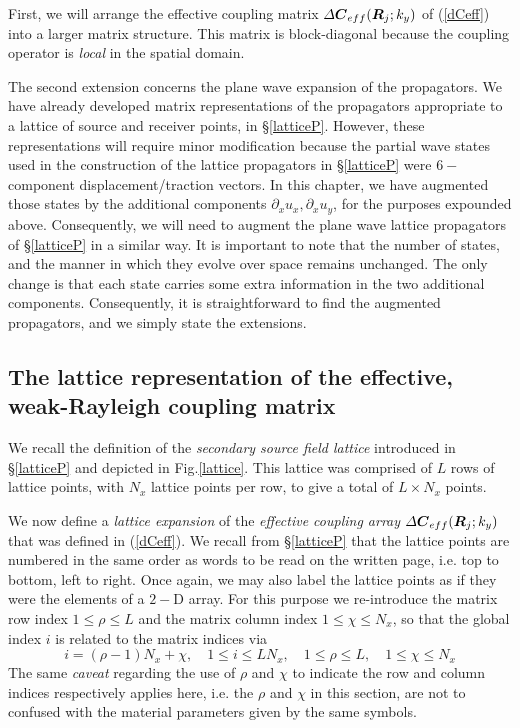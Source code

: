 First, we will arrange the effective coupling matrix ${\mit \Delta}{\mbox{\boldmath$\mit C$\unboldmath}}{}_{eff}({\mbox{\boldmath$\mit R$\unboldmath}}_j;k_y)$ of (\ref{dCeff}) into a larger matrix structure. This matrix 
is block-diagonal because the coupling operator is {\em local\/} in the spatial 
domain.  

The second extension concerns the plane wave expansion of the propagators.
We have already developed  matrix representations of the propagators 
appropriate to a lattice of source and receiver points, in 
\S\ref{latticeP}. However, these representations will require minor 
modification because the partial wave states used in the construction of 
the lattice propagators in \S\ref{latticeP} were $6-$component 
displacement/traction vectors. In this chapter, we have augmented those 
states by the  additional components $\partial_x u_x, \partial_x u_y$, 
for the purposes expounded above. Consequently, we will need to augment 
the plane wave lattice propagators of \S\ref{latticeP} in a similar way.
It is important to note that the number of states, and the manner in 
which they evolve over space remains unchanged. The only change is that 
each state carries some extra information in the two additional 
components. Consequently, it is straightforward to find the augmented 
propagators, and we simply state the extensions. 



\subsection{The lattice representation of the effective, weak-Rayleigh 
coupling matrix}

We recall the definition of the {\em secondary source field lattice\/} 
introduced in \S\ref{latticeP} and depicted in Fig.\ref{lattice}. This lattice was 
comprised of $L$ rows of lattice points, with $N_x$ lattice points per 
row, to give a total of $L \times N_x$ points.

We now define a {\em lattice expansion\/} of the {\em effective coupling array\/} 
${\mit \Delta}{\mbox{\boldmath$\mit C$\unboldmath}}{}_{eff}({\mbox{\boldmath$\mit R$\unboldmath}}_j;k_y)$ that was defined in (\ref{dCeff}). We recall from \S\ref{latticeP} that the 
lattice points are numbered in the same order as words to be read on the 
written page, i.e. top to bottom, left to right.
Once again, we may also  label the lattice 
points as if they were the elements of a $2-$D array. For this purpose we 
re-introduce the matrix row index $1\le \rho \le L$ and the matrix column 
index $1 \le \chi \le N_x$, so that the global index $i$ is related to 
the matrix indices via
\[
i=(\rho -1) N_x + \chi, \quad 1 \le i \le L N_x, 
\quad 1 \le \rho \le L, \quad 1 \le \chi \le N_x
\] 
The same {\em caveat\/} regarding the use of $\rho$ and $\chi$ to indicate the row and column 
indices respectively applies here, i.e. the  $\rho$ and $\chi$ in this 
section,  are not to confused with the material parameters given by the 
same symbols.

